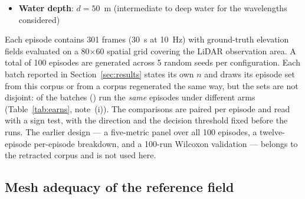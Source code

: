 \documentclass[review]{elsarticle}
\begin{document}
\begin{itemize}
    (a)~\emph{Geometry-weighted}: retention probability
    $P\propto R_{\text{Fresnel}}(\theta)\cos\theta/d^2$, so near-range,
    near-normal facets are preferentially retained.
    (b)~\emph{Unweighted}: each ray hit is retained with equal
    probability, calibrated to the same expected return count.
    We retain the historical labels ``uniform'' and ``slope'' for
    these two models for consistency with the released dataset.
    The second model was originally specified as a specular-backscatter
    channel, but that channel is unreachable at the grazing incidence
    angles of a mast-mounted LiDAR: retro-specular return requires the
    ray to strike within $\alpha/2 = 2.5^\circ$ of the surface normal,
    whereas the beam fan spans $78$--$90^\circ$ from vertical and wave
    slopes reach only ${\sim}7^\circ$ at BF7.  The implementation
    consequently always takes its unweighted fallback path, which is
    what we describe and report here.  The contrast is therefore a test
    of sensitivity to the \emph{spatial weighting} of returns, not of
    diffuse versus specular optics
  \item \textbf{Water depth}: $d = 50$~m (intermediate to deep water
    for the wavelengths considered)
\end{itemize}

Each episode contains 301 frames (30~s at 10~Hz) with ground-truth
elevation fields evaluated on a 80$\times$60 spatial grid
covering the LiDAR observation area.
A total of 100 episodes are generated across 5 random seeds per
configuration.
Each batch reported in Section~\ref{sec:results} states its own $n$ and draws its
episode set from this corpus or from a corpus regenerated the same way, but the sets
are not disjoint: \HosSameN{} of the batches (\HosSameRows{}) run the \emph{same}
\AblationEps{} episodes under different arms (Table~\ref{tab:earns}, note~(i)). The
comparisons are paired per episode and read with a sign test, with the direction and
the decision threshold fixed before the runs. The earlier design --- a five-metric
panel over all 100 episodes, a twelve-episode per-episode breakdown, and a
100-run Wilcoxon validation --- belongs to the retracted corpus and is not used
here.

\subsection{Mesh adequacy of the reference field}
\label{sec:regen}
\end{document}
